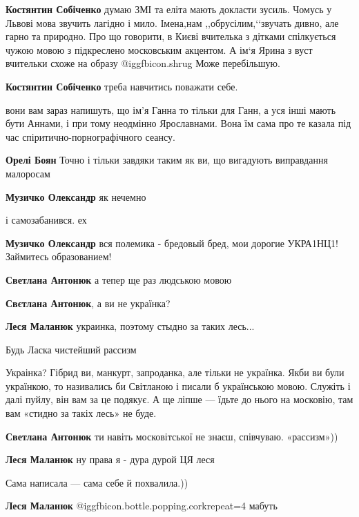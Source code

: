 \begin{itemize}
\begin{itemize}
\textbf{Костянтин Собіченко} думаю ЗМІ та еліта мають докласти зусиль. Чомусь у Львові мова звучить лагідно і мило. Імена,нам ,,обрусілим,‘‘звучать дивно, але гарно та природно.
Про що говорити, в Києві вчителька з дітками спілкується чужою мовою з підкреслено московським акцентом. А ім‘я Ярина з вуст вчительки схоже на образу @igg{fbicon.shrug} 
Може перебільшую.

\textbf{Костянтин Собіченко} треба навчитись поважати себе.


вони вам зараз напишуть, що ім'я Ганна то тільки для Ганн, а уся інші мають
бути Аннами, і при тому неодмінно Ярославнами. Вона їм сама про те казала під
час спіритично-порнографічного сеансу.


\textbf{Орелі Боян} Точно і тільки завдяки таким як ви, що вигадують виправдання малоросам

\textbf{Музичко Олександр} як нечемно

і самозабанився. ех

\textbf{Музичко Олександр} вся полемика - бредовый бред, мои дорогие УКРА1НЦ1! Займитесь образованием!

\textbf{Светлана Антонюк} а тепер ще раз людською мовою

\textbf{Свєтлана Антонюк}, а ви не українка?

\textbf{Леся Маланюк} украинка, поэтому стыдно за таких лесь...

Будь Ласка чистейший рассизм

Украінка? Гібрид ви, манкурт, запроданка, але тільки не українка.
Якби ви були українкою, то називались би Світланою і писали б українською мовою. Служіть і далі пуйлу, він вам за це подякує. А ще ліпше — їдьте до нього на московію, там вам «стидно за такіх лесь» не буде.

\textbf{Светлана Антонюк} ти навіть московітської не знаєш, співчуваю. «рассизм»))

\textbf{Леся Маланюк} ну права я - дура дурой ЦЯ леся

Сама написала — сама себе й похвалила.))

\textbf{Леся Маланюк}  @igg{fbicon.bottle.popping.cork}{repeat=4} мабуть


\end{itemize}
\end{itemize}
